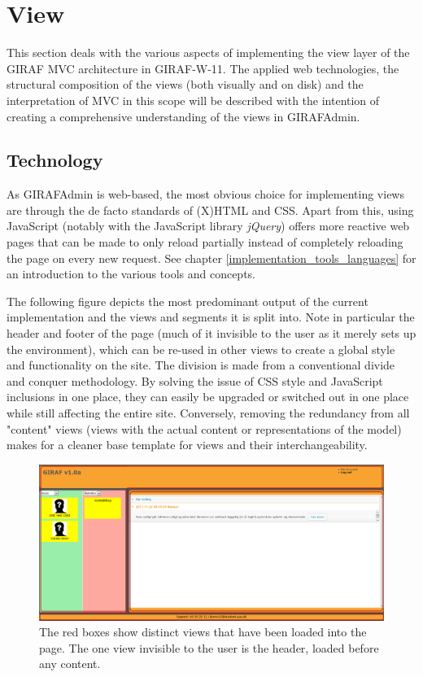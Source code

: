 \section{View}
\label{view}
This section deals with the various aspects of implementing the view layer of the GIRAF MVC architecture in GIRAF-W-11. The applied web technologies, the structural composition of the views (both visually and on disk) and the interpretation of MVC in this scope will be described with the intention of creating a comprehensive understanding of the views in GIRAFAdmin.

\subsection{Technology}
As GIRAFAdmin is web-based, the most obvious choice for implementing views are through the de facto standards of (X)HTML and CSS. Apart from this, using JavaScript (notably with the JavaScript library \emph{jQuery}) offers more reactive web pages that can be made to only reload partially instead of completely reloading the page on every new request. See chapter \vref{implementation_tools_languages} for an introduction to the various tools and concepts.

The following figure depicts the most predominant output of the current implementation and the views and segments it is split into. Note in particular the header and footer of the page (much of it invisible to the user as it merely sets up the environment), which can be re-used in other views to create a global style and functionality on the site. The division is made from a conventional divide and conquer methodology. By solving the issue of CSS style and JavaScript inclusions in one place, they can easily be upgraded or switched out in one place while still affecting the entire site. Conversely, removing the redundancy from all "content" views (views with the actual content or representations of the model) makes for a cleaner base template for views and their interchangeability.

\begin{figure}
    \begin{center}
    \includegraphics[scale=0.45,angle=90]{img/mvc_details/mvc_detailed_views}
    \caption{\label{implementation_view_views1}The red boxes show distinct views that have been loaded into the page. The one view invisible to the user is the header, loaded before any content.}
    \end{center}
\end{figure}

